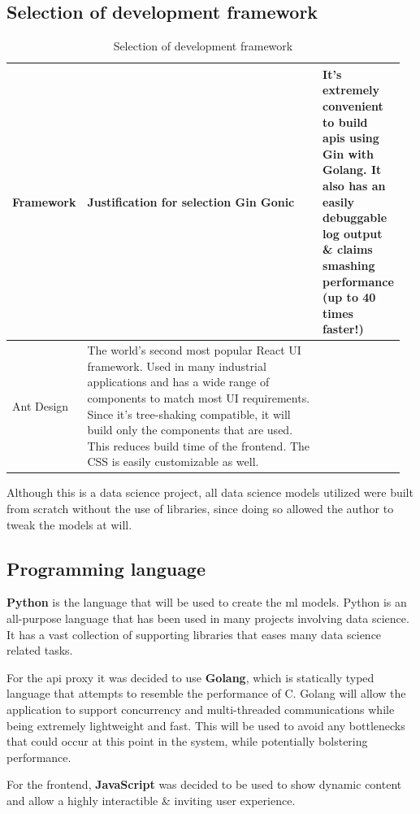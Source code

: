 \subsection{Selection of development framework}
\vspace{-4mm}
\begin{longtable}{|p{0.16\linewidth}|p{0.8\linewidth}|}
\caption{Selection of development framework}\\ 
\hline
\textbf{Framework} & \textbf{Justification for selection}\endfirsthead 
\hline
Gin Gonic & It's extremely convenient to build \gls{api}s using Gin with Golang. It also has an easily debuggable log output \& claims smashing performance (up to 40 times faster!)\\
\hline
Ant Design & The world's second most popular React UI framework. Used in many industrial applications and has a wide range of components to match most UI requirements. Since it's tree-shaking compatible, it will build only the components that are used. This reduces build time of the frontend. The CSS is easily customizable as well. \\ 
\hline
\end{longtable}

Although this is a data science project, all data science models utilized were built from scratch without the use of libraries, since doing so allowed the author to tweak the models at will.


\subsection{Programming language}
\textbf{Python} is the language that will be used to create the \gls{ml} models.  Python is an all-purpose language that has been used in many projects involving data science. It has a vast collection of supporting libraries that eases many data science related tasks.

For the \gls{api} proxy it was decided to use \textbf{Golang}, which is statically typed language that attempts to resemble the performance of C. Golang will allow the application to support concurrency and multi-threaded communications while being extremely lightweight and fast. This will be used to avoid any bottlenecks that could occur at this point in the system, while potentially bolstering performance.

For the frontend, \textbf{JavaScript} was decided to be used to show dynamic content and allow a highly interactible \& inviting user experience.

